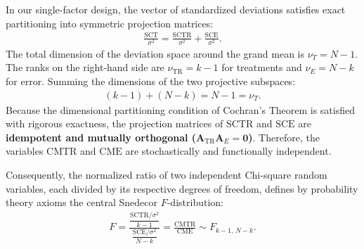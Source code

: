 \begin{solproblema}
\begin{enumerate}
		In our single-factor design, the vector of standardized deviations satisfies exact partitioning into symmetric projection matrices:
		\begin{align}
			\frac{\text{SCT}}{\sigma^2} = \frac{\text{SCTR}}{\sigma^2} + \frac{\text{SCE}}{\sigma^2}.
		\end{align}
		The total dimension of the deviation space around the grand mean is $\nu_T = N - 1$. The ranks on the right-hand side are $\nu_{\text{TR}} = k - 1$ for treatments and $\nu_E = N - k$ for error. Summing the dimensions of the two projective subspaces:
		\begin{align}
			(k - 1) + (N - k) = N - 1 = \nu_T.
		\end{align}
		Because the dimensional partitioning condition of Cochran's Theorem is satisfied with rigorous exactness, the projection matrices of $\text{SCTR}$ and $\text{SCE}$ are \textbf{idempotent and mutually orthogonal ($\mathbf{A}_{\text{TR}} \mathbf{A}_E = \mathbf{0}$)}. Therefore, the variables $\text{CMTR}$ and $\text{CME}$ are stochastically and functionally independent.
		
		Consequently, the normalized ratio of two independent Chi-square random variables, each divided by its respective degrees of freedom, defines by probability theory axioms the central Snedecor $F$-distribution:
		\begin{align}
			F = \frac{\dfrac{\text{SCTR}/\sigma^2}{k-1}}{\dfrac{\text{SCE}/\sigma^2}{N-k}} = \frac{\text{CMTR}}{\text{CME}} \sim F_{k-1, \, N-k}.
		\end{align}
	\end{enumerate}
\end{solproblema}

